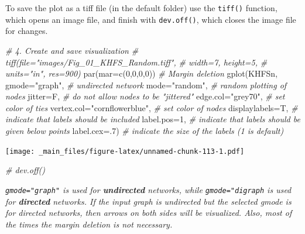 \documentclass[
  notitlepage,
  onecolumn,
  openany]{book}
\newenvironment{Shaded}{\begin{snugshade}}{\end{snugshade}}
\newcommand{\AttributeTok}[1]{\textcolor[rgb]{0.77,0.63,0.00}{#1}}
\newcommand{\CommentTok}[1]{\textcolor[rgb]{0.56,0.35,0.01}{\textit{#1}}}
\newcommand{\DecValTok}[1]{\textcolor[rgb]{0.00,0.00,0.81}{#1}}
\newcommand{\FunctionTok}[1]{\textcolor[rgb]{0.00,0.00,0.00}{#1}}
\newcommand{\NormalTok}[1]{#1}
\newcommand{\StringTok}[1]{\textcolor[rgb]{0.31,0.60,0.02}{#1}}
\begin{document}
To save the plot as a tiff file (in the default folder) use the \texttt{tiff()} function, which opens an image file,
and finish with \texttt{dev.off()}, which closes the image file for changes.

\begin{Shaded}
\begin{Highlighting}[]
\CommentTok{\# 4. Create and save visualization}
\CommentTok{\# tiff(file="images/Fig\_01\_KHFS\_Random.tiff", }
\CommentTok{\#      width=7, height=5,}
\CommentTok{\#      units="in", res=900)}
\FunctionTok{par}\NormalTok{(}\AttributeTok{mar=}\FunctionTok{c}\NormalTok{(}\DecValTok{0}\NormalTok{,}\DecValTok{0}\NormalTok{,}\DecValTok{0}\NormalTok{,}\DecValTok{0}\NormalTok{)) }\CommentTok{\# Margin deletion}
\FunctionTok{gplot}\NormalTok{(KHFSn,}
      \AttributeTok{gmode=}\StringTok{"graph"}\NormalTok{,      }\CommentTok{\# undirected network}
      \AttributeTok{mode=}\StringTok{"random"}\NormalTok{,      }\CommentTok{\# random plotting of nodes}
      \AttributeTok{jitter=}\NormalTok{F,           }\CommentTok{\# do not allow nodes to be "jittered"}
      \AttributeTok{edge.col=}\StringTok{"grey70"}\NormalTok{,  }\CommentTok{\# set color of ties}
      \AttributeTok{vertex.col=}\StringTok{"cornflowerblue"}\NormalTok{,   }\CommentTok{\# set color of nodes}
      \AttributeTok{displaylabels=}\NormalTok{T,    }\CommentTok{\# indicate that labels should be included}
      \AttributeTok{label.pos=}\DecValTok{1}\NormalTok{,        }\CommentTok{\# indicate that labels should be given below points}
      \AttributeTok{label.cex=}\NormalTok{.}\DecValTok{7}\NormalTok{)       }\CommentTok{\# indicate the size of the labels (1 is default)}
\end{Highlighting}
\end{Shaded}

\texttt{[image: \_main\_files/figure-latex/unnamed-chunk-113-1.pdf]}

\begin{Shaded}
\begin{Highlighting}[]
\CommentTok{\# dev.off()}
\end{Highlighting}
\end{Shaded}

\emph{\texttt{gmode="graph"} is used for \textbf{undirected} networks, while \texttt{gmode="digraph} is used for \textbf{directed} networks. If the input graph is undirected but the selected gmode is for directed networks, then arrows on both sides will be visualized. Also, most of the times the margin deletion is not necessary.}
\end{document}
